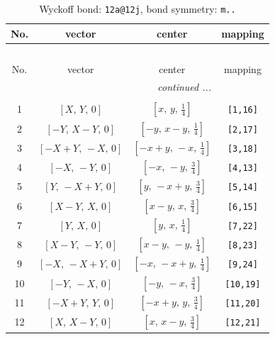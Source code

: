 \documentclass[fleqn,8pt]{jsarticle}
\begin{document}
\begin{longtable}{cccc}
\caption{Wyckoff bond: {\tt 12a@12j}, bond symmetry: {\tt m..}}
 \\
 \hline \hline
No. & vector & center & mapping \\ \hline \endfirsthead

\multicolumn{3}{l}{\tablename\ \thetable{}} \\
 \hline \hline
No. & vector & center & mapping \\ \hline \endhead

 \hline \hline
\multicolumn{3}{r}{\footnotesize\it continued ...} \\ \endfoot

 \hline \hline
\multicolumn{3}{r}{} \\ \endlastfoot

1 & $\left[ X,\, Y,\, 0 \right]$ & $\left[ x,\, y,\, \frac{1}{4} \right]$ & {\tt [1,16]} \\ \hline
2 & $\left[ - Y,\, X - Y,\, 0 \right]$ & $\left[ - y,\, x - y,\, \frac{1}{4} \right]$ & {\tt [2,17]} \\ \hline
3 & $\left[ - X + Y,\, - X,\, 0 \right]$ & $\left[ - x + y,\, - x,\, \frac{1}{4} \right]$ & {\tt [3,18]} \\ \hline
4 & $\left[ - X,\, - Y,\, 0 \right]$ & $\left[ - x,\, - y,\, \frac{3}{4} \right]$ & {\tt [4,13]} \\ \hline
5 & $\left[ Y,\, - X + Y,\, 0 \right]$ & $\left[ y,\, - x + y,\, \frac{3}{4} \right]$ & {\tt [5,14]} \\ \hline
6 & $\left[ X - Y,\, X,\, 0 \right]$ & $\left[ x - y,\, x,\, \frac{3}{4} \right]$ & {\tt [6,15]} \\ \hline
7 & $\left[ Y,\, X,\, 0 \right]$ & $\left[ y,\, x,\, \frac{1}{4} \right]$ & {\tt [7,22]} \\ \hline
8 & $\left[ X - Y,\, - Y,\, 0 \right]$ & $\left[ x - y,\, - y,\, \frac{1}{4} \right]$ & {\tt [8,23]} \\ \hline
9 & $\left[ - X,\, - X + Y,\, 0 \right]$ & $\left[ - x,\, - x + y,\, \frac{1}{4} \right]$ & {\tt [9,24]} \\ \hline
10 & $\left[ - Y,\, - X,\, 0 \right]$ & $\left[ - y,\, - x,\, \frac{3}{4} \right]$ & {\tt [10,19]} \\ \hline
11 & $\left[ - X + Y,\, Y,\, 0 \right]$ & $\left[ - x + y,\, y,\, \frac{3}{4} \right]$ & {\tt [11,20]} \\ \hline
12 & $\left[ X,\, X - Y,\, 0 \right]$ & $\left[ x,\, x - y,\, \frac{3}{4} \right]$ & {\tt [12,21]} \\
\end{longtable}
\end{document}
